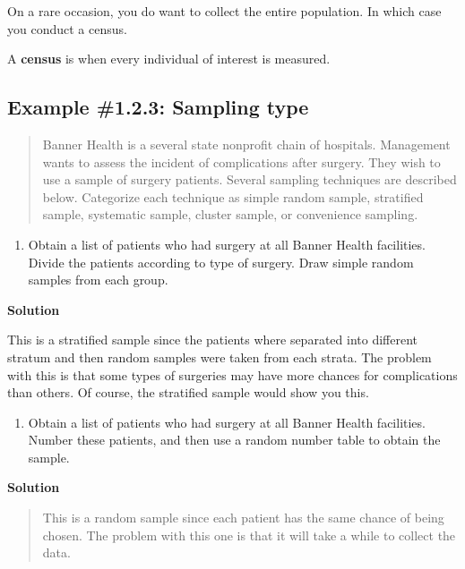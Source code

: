 \documentclass[]{book}
\providecommand{\tightlist}{%
  \setlength{\itemsep}{0pt}\setlength{\parskip}{0pt}}
\begin{document}
On a rare occasion, you do want to collect the entire population. In
which case you conduct a census.

A \textbf{census} is when every individual of interest is measured.

\hypertarget{example-1.2.3-sampling-type}{%
\subsection{Example \#1.2.3: Sampling type}\label{example-1.2.3-sampling-type}}

\begin{quote}
Banner Health is a several state nonprofit chain of hospitals. Management wants to assess the incident of complications after surgery. They wish to use a sample of surgery patients. Several sampling techniques are described below. Categorize each technique as simple random sample, stratified sample, systematic sample, cluster sample, or convenience sampling.
\end{quote}

\begin{enumerate}
\def\labelenumi{\alph{enumi}.}
\tightlist
\item
  Obtain a list of patients who had surgery at all Banner Health
  facilities. Divide the patients according to type of surgery. Draw
  simple random samples from each group.
\end{enumerate}

\textbf{Solution}

This is a stratified sample since the patients where separated into
different stratum and then random samples were taken from each
strata. The problem with this is that some types of surgeries may
have more chances for complications than others. Of course, the
stratified sample would show you this.

\begin{enumerate}
\def\labelenumi{\alph{enumi}.}
\setcounter{enumi}{1}
\tightlist
\item
  Obtain a list of patients who had surgery at all Banner Health
  facilities. Number these patients, and then use a random number
  table to obtain the sample.
\end{enumerate}

\textbf{Solution}

\begin{quote}
This is a random sample since each patient has the same chance of
being chosen. The problem with this one is that it will take a while
to collect the data.
\end{quote}
\end{document}
